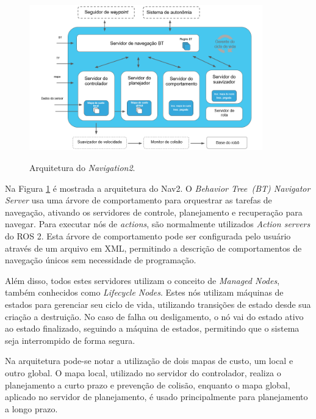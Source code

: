\documentclass[repeatfields,xlists,xpacks,oneside,yearsonly]{ufrgscca}
\begin{document}
\begin{figure}[htbp]
    {
        \centering
        \caption{Arquitetura do \textit{Navigation2}.}
        \label{fig:nav2_arc}
        \includegraphics[width=0.9\textwidth]{nav2_architecture_trad.png}\\
    }
    {} %
\end{figure}

Na Figura \ref{fig:nav2_arc} é mostrada a arquitetura do Nav2.
O \textit{Behavior Tree~(BT) Navigator Server} usa uma árvore de comportamento para
orquestrar as tarefas de navegação, ativando os servidores de controle, planejamento e
recuperação para navegar.
Para executar nós de \textit{actions}, são normalmente utilizados
\textit{Action servers} do ROS 2.
Esta árvore de comportamento pode ser configurada pelo usuário através de um arquivo
em XML, permitindo a descrição de comportamentos de navegação únicos sem
necessidade de programação.

Além disso, todos estes servidores utilizam o conceito de \textit{Managed Nodes},
também conhecidos como \textit{Lifecycle Nodes}.
Estes nós utilizam máquinas de estados para gerenciar seu ciclo de vida, utilizando
transições de estado desde sua criação a destruição.
No caso de falha ou desligamento, o nó vai do estado ativo ao estado finalizado,
seguindo a máquina de estados, permitindo que o sistema seja interrompido
de forma segura.

Na arquitetura pode-se notar a utilização de dois mapas de custo, um local e
outro global.
O mapa local, utilizado no servidor do controlador, realiza o planejamento
a curto prazo e prevenção de colisão, enquanto o mapa global,
aplicado no servidor de planejamento, é usado principalmente
para planejamento a longo prazo.
\end{document}
